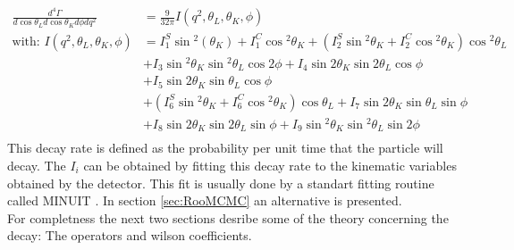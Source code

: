 \documentclass[english]{uzhpub}
\begin{document}
 \begin{equation}
  \begin{split}
   \frac{d^4 \Gamma}{d \cos{ \theta_L} d \cos{\theta_K} d \phi d q^2} &= \frac{9}{32 \pi} I(q^2,\theta_L, \theta_K, \phi) \\
   \text{with: } I(q^2,\theta_L, \theta_K, \phi) &= I_1^S \sin{^2(\theta_K)} + I_1^C \cos{^2 \theta_K} + \left(I_2^S \sin{^2 \theta_K} + I_2^C \cos{^2 \theta_K} \right) \cos{^2\theta_L} \\
   &+ I_3 \sin{^2 \theta_K} \sin{^2 \theta_L} \cos{2\phi} + I_4 \sin{2\theta_K} \sin{2\theta_L} \cos{\phi} \\
   &+ I_5 \sin{2\theta_K} \sin{ \theta_L} \cos{ \phi} \\
   &+ \left(I_6^S \sin{^2 \theta_K} + I_6^C \cos{^2 \theta_K}  \right) \cos{ \theta_L} + I_7 \sin{ 2\theta_K} \sin{\theta_L} \sin{\phi} \\
   &+ I_8 \sin{ 2\theta_K} \sin{ 2\theta_L} \sin{ \phi} + I_9 \sin{^2 \theta_K} \sin{^2 \theta_L} \sin{2 \phi}\\
  \end{split}
  \label{eq:diff_decay_rate}
 \end{equation}
 This decay rate is defined as the probability per unit time that the particle will decay. The $I_i$ can be obtained by fitting this decay rate to the kinematic variables obtained by the detector. This fit is usually done by a standart fitting routine called MINUIT \cite{bib:Minuit}. In section \ref{sec:RooMCMC} an alternative is presented. \\
 For completness the next two sections desribe some of the theory concerning the decay: The operators and wilson coefficients.
\end{document}
